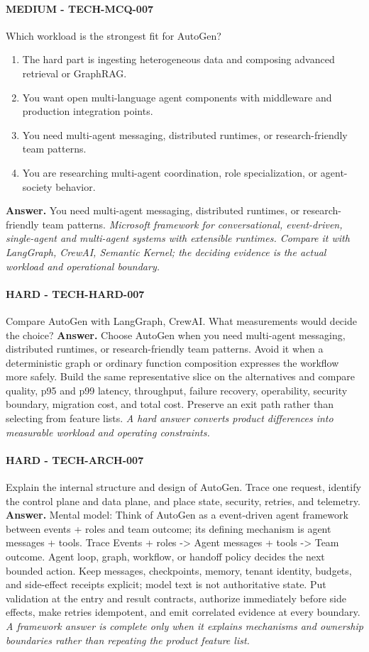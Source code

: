 \paragraph{MEDIUM - TECH-MCQ-007} Which workload is the strongest fit for AutoGen?
\begin{enumerate}[label=\Alph*.]
\item The hard part is ingesting heterogeneous data and composing advanced retrieval or GraphRAG.
\item You want open multi-language agent components with middleware and production integration points.
\item You need multi-agent messaging, distributed runtimes, or research-friendly team patterns.
\item You are researching multi-agent coordination, role specialization, or agent-society behavior.
\end{enumerate}
\textbf{Answer.} You need multi-agent messaging, distributed runtimes, or research-friendly team patterns.
\textit{Microsoft framework for conversational, event-driven, single-agent and multi-agent systems with extensible runtimes. Compare it with LangGraph, CrewAI, Semantic Kernel; the deciding evidence is the actual workload and operational boundary.}
\paragraph{HARD - TECH-HARD-007} Compare AutoGen with LangGraph, CrewAI. What measurements would decide the choice?
\textbf{Answer.} Choose AutoGen when you need multi-agent messaging, distributed runtimes, or research-friendly team patterns. Avoid it when a deterministic graph or ordinary function composition expresses the workflow more safely. Build the same representative slice on the alternatives and compare quality, p95 and p99 latency, throughput, failure recovery, operability, security boundary, migration cost, and total cost. Preserve an exit path rather than selecting from feature lists.
\textit{A hard answer converts product differences into measurable workload and operating constraints.}
\paragraph{HARD - TECH-ARCH-007} Explain the internal structure and design of AutoGen. Trace one request, identify the control plane and data plane, and place state, security, retries, and telemetry.
\textbf{Answer.} Mental model: Think of AutoGen as a event-driven agent framework between events + roles and team outcome; its defining mechanism is agent messages + tools. Trace Events + roles -> Agent messages + tools -> Team outcome. Agent loop, graph, workflow, or handoff policy decides the next bounded action. Keep messages, checkpoints, memory, tenant identity, budgets, and side-effect receipts explicit; model text is not authoritative state. Put validation at the entry and result contracts, authorize immediately before side effects, make retries idempotent, and emit correlated evidence at every boundary.
\textit{A framework answer is complete only when it explains mechanisms and ownership boundaries rather than repeating the product feature list.}
